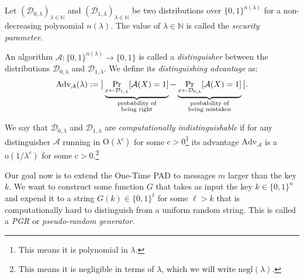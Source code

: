 \documentclass[./main]{subfiles}
\begin{document}
  \begin{defn}
    Let $(\mathcal{D}_{0, \lambda})_{\lambda \in \mathds{N}}$ and $(\mathcal{D}_{1, \lambda})_{\lambda \in \mathds{N}}$ be two distributions over $\{0,1\}^{n(\lambda)}$ for a non-decreasing polynomial $n(\lambda)$.
    The value of $\lambda \in \mathds{N}$ is called the \textit{security parameter}.

    An algorithm $\mathcal{A} : \{0,1\}^{n(\lambda)} \to \{0,1\}$ is called a \textit{distinguisher} between the distributions $\mathcal{D}_{0, \lambda}$ and $\mathcal{D}_{1, \lambda}$. We define its \textit{distinguishing advantage} as:
    \[
      \mathrm{Adv}_\mathcal{A}(\lambda) := \big| \underbrace{\Pr_{x \gets \mathcal{D}_{1, \lambda}} [\mathcal{A}(X) = 1]}_{ \mathclap{\substack{\text{probability of}\\ \text{being right}}} } - \underbrace{\Pr_{x \gets \mathcal{D}_{0, \lambda}} [\mathcal{A}(X) = 1]}_{\mathclap{\substack{\text{probability of}\\ \text{being mistaken}}}} \big|
    .\] 

    We say that $\mathcal{D}_{0, \lambda}$ and $\mathcal{D}_{1, \lambda}$ are \textit{computationally indistinguishable} if for any distinguisher $\mathcal{A}$ running in $\mathrm{O}(\lambda^c)$ for some $c > 0$\footnote{This means it is polynomial in $\lambda$.} its advantage $\mathrm{Adv}_\mathcal{A}$ is a $\mathrm{o}(1 / \lambda^c)$ for some $c > 0$.\footnote{This means it is negligible in terms of $\lambda$, which we will write $\mathrm{negl}(\lambda)$.}
  \end{defn}
  
  Our goal now is to extend the One-Time PAD to messages $m$ larger than the key $k$.
  We want to construct some function $G$ that takes as input the key $k \in \{0,1\}^n$ and expend it to a string $G(k) \in \{0,1\}^\ell$  for some $\ell > k$ that is computationally hard to distinguish from a uniform random string.
  This is called a \textit{PGR} or \textit{pseudo-random generator}.
\end{document}
